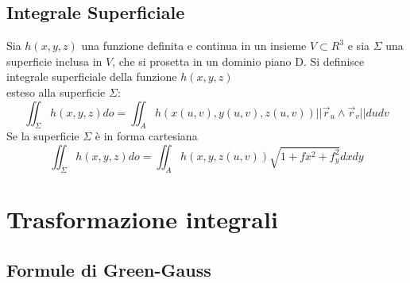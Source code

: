 \documentclass{book}
\begin{document}
\subsection{Integrale Superficiale}
Sia $h(x,y,z)$ una funzione definita e continua in un insieme $V \subset R^3$ e
sia $\Sigma$ una superficie inclusa in $V$, che si prosetta in un dominio piano
D. Si definisce {\color{red}integrale superficiale} della funzione $h(x,y,z)$\\
esteso alla superficie $\Sigma$:
\begin{equation*}
	\iint_\Sigma h(x,y,z)do=\iint_A h(x(u, v), y(u, v), z(u, v))||\vec{r}_u\wedge
	\vec{r}_v|| dudv
\end{equation*}
Se la superficie $\Sigma$ è in forma cartesiana
\begin{equation*}
	\iint_\Sigma h(x,y,z)do=\iint_A h(x, y, z(u, v))\sqrt{1+fx^2+f_y^2} dxdy
\end{equation*}
\clearpage
\section{Trasformazione integrali}
\subsection{Formule di Green-Gauss}
\end{document}
